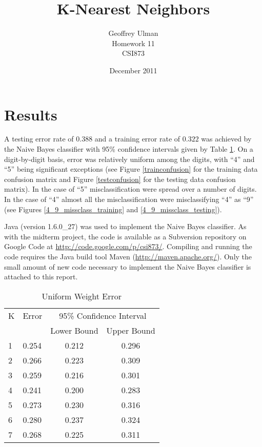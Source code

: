 \documentclass{article}
\begin{document}
\title{K-Nearest Neighbors}
\author{Geoffrey Ulman\\
        Homework 11\\
        CSI873}
\date{December 2011}
\maketitle

\section{Results}\label{Results}

A testing error rate of \(0.388\) and a training error rate of \(0.322\) was achieved by the Naive Bayes classifier with 95\% confidence intervals given by Table \ref{error}. On a digit-by-digit basis, error was relatively uniform among the digits, with ``4'' and ``5'' being significant exceptions (see Figure \ref{trainconfusion} for the training data confusion matrix and Figure \ref{testconfusion} for the testing data confusion matrix). In the case of ``5'' misclassification were spread over a number of digits. In the case of ``4'' almost all the misclassification were misclassifying ``4'' as ``9'' (see Figures \ref{4_9_missclass_training} and \ref{4_9_missclass_testing}).

Java (version 1.6.0\_27) was used to implement the Naive Bayes classifier. As with the midterm project, the code is available as a Subversion repository on Google Code at \url{http://code.google.com/p/csi873/}. Compiling and running the code requires the Java build tool Maven (\url{http://maven.apache.org/}). Only the small amount of new code necessary to implement the Naive Bayes classifier is attached to this report.


\begin{table}
\caption{Uniform Weight Error}
\begin{center}
\begin{tabular}{llcc}
\toprule
K & Error & \multicolumn{2}{c}{95\% Confidence Interval} \\
\cmidrule(r){3-4}
& & Lower Bound & Upper Bound \\
\midrule
1 & 0.254 & 0.212 & 0.296 \\
2 & 0.266 & 0.223 & 0.309 \\
3 & 0.259 & 0.216 & 0.301 \\
4 & 0.241 & 0.200 & 0.283 \\
5 & 0.273 & 0.230 & 0.316 \\
6 & 0.280 & 0.237 & 0.324 \\
7 & 0.268 & 0.225 & 0.311 \\
\bottomrule
\end{tabular}
\label{error}
\end{center}
\end{table}
\end{document}
